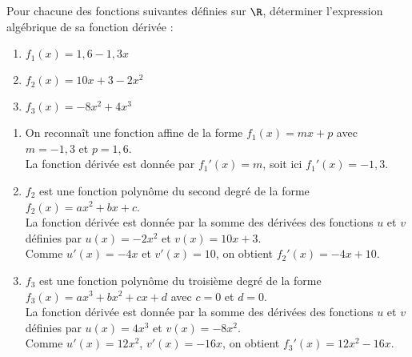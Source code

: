 \documentclass[a4paper,11pt,exos]{nsi} %
\begin{document}

\maketitle

\begin{exercice}
    Pour chacune des fonctions suivantes définies sur $\R$, déterminer l'expression algébrique de sa fonction dérivée :
    \begin{multicols}{3}
        \begin{enumerate}
            \item $f_1(x)=1{,}6-1{,}3x$
        
            \item $f_2(x)= 10x+3-2x^2$
            \item $f_3(x)= -8x^2+4x^3$
        \end{enumerate}
    \end{multicols}
    
    \end{exercice}

        \begin{enumerate}
            \item On reconnaît une fonction affine de la forme $f_1(x)=mx+p$ avec $m=-1,3$ et $p=1,6$.\\
            La fonction dérivée est donnée par $f_1'(x)=m$, soit ici $f_1'(x)=-1,3$.
        
            \item $f_2$ est une fonction polynôme du second degré de la forme $f_2(x)=ax^2+bx+c$.\\
            La fonction dérivée est donnée par la somme des dérivées des fonctions $u$ et $v$ définies par $u(x)=-2x^2$ et $v(x)=10x+3$.\\
             Comme $u'(x)=-4x$ et $v'(x)=10$, on obtient  $f_2'(x)=-4x+10$.
            
            \item $f_3$ est une fonction polynôme du troisième degré de la forme $f_3(x)=ax^3+bx^2+cx+d$ avec $c=0$ et $d=0$.\\
            La fonction dérivée est donnée par la somme des dérivées des fonctions $u$ et $v$  définies par $u(x)=4x^3$ et $v(x)=-8x^2$.\\
             Comme $u'(x)=12x^2$, $v'(x)=-16x$, on obtient  $f_3'(x)=12x^2-16x$. 
        \end{enumerate}
\end{document}

